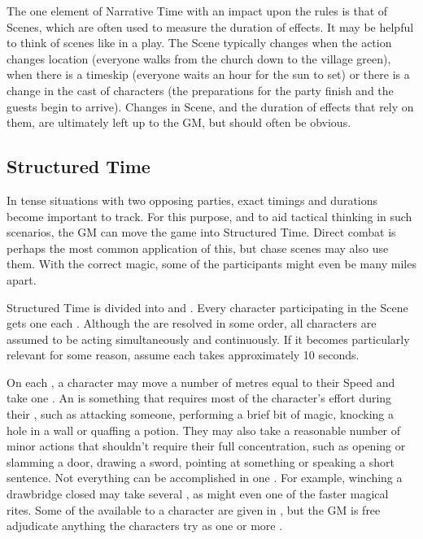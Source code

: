 The one element of Narrative Time with an impact upon the rules is that of Scenes, which are often used to measure the duration of effects.
It may be helpful to think of scenes like in a play.
The Scene typically changes when the action changes location (everyone walks from the church down to the village green), when there is a timeskip (everyone waits an hour for the sun to set) or there is a change in the cast of characters (the preparations for the party finish and the guests begin to arrive).
Changes in Scene, and the duration of effects that rely on them, are ultimately left up to the GM, but should often be obvious.

\subsection{Structured Time}

In tense situations with two opposing parties, exact timings and durations become important to track.
For this purpose, and to aid tactical thinking in such scenarios, the GM can move the game into Structured Time.
Direct combat is perhaps the most common application of this, but chase scenes may also use them.
With the correct magic, some of the participants might even be many miles apart.

Structured Time is divided into {\rounds} and {\turns}.
Every character participating in the Scene gets one {\turn} each {\round}.
Although the {\turns} are resolved in some order, all characters are assumed to be acting simultaneously and continuously.
If it becomes particularly relevant for some reason, assume each {\round} takes approximately 10 seconds.

On each {\turn}, a character may move a number of metres equal to their Speed and take one {\action}.
An {\action} is something that requires most of the character's effort during their {\turn}, such as attacking someone, performing a brief bit of magic, knocking a hole in a wall or quaffing a potion.
They may also take a reasonable number of minor actions that shouldn't require their full concentration, such as opening or slamming a door, drawing a sword, pointing at something or speaking a short sentence.
Not everything can be accomplished in one {\action}.
For example, winching a drawbridge closed may take several {\actions}, as might even one of the faster magical rites.
Some of the {\actions} available to a character are given in , but the GM is free adjudicate anything the characters try as one or more {\actions}.

